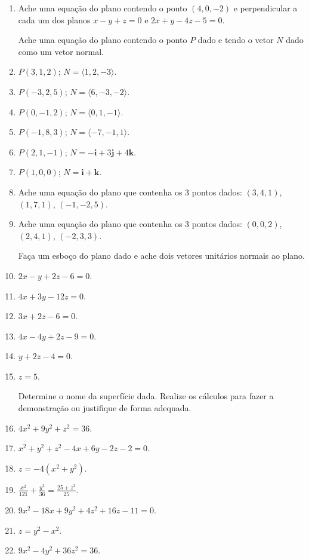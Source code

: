 \documentclass[11pt,a4paper]{article}
\begin{document}
\begin{enumerate}
	\item Ache uma equação do plano contendo o ponto $(4,0,-2)$ e perpendicular a cada um dos planos
	$x - y + z = 0$ e $2x + y - 4z - 5 = 0$.
	
	Ache uma equação do plano contendo o ponto $P$ dado e tendo o vetor $N$ dado como um vetor normal.
	
	\item $P(3,1,2)$; $N = \langle 1, 2, -3 \rangle$.
	 
	\item $P(-3,2,5)$; $N = \langle 6, -3, -2 \rangle$.
	 
	\item $P(0,-1,2)$; $N = \langle 0, 1, -1 \rangle$.
	 
	\item $P(-1,8,3)$; $N = \langle -7, -1, 1 \rangle$.
	 
	\item $P(2,1,-1)$; $N = -\textbf{i} + 3\textbf{j} + 4\textbf{k}$.
	 
	 
	 
	 
	 
	 
	\item $P(1,0,0)$; $N = \textbf{i} + \textbf{k}$.
	
	\item Ache uma equação do plano que contenha os $3$ pontos dados:
	$(3,4,1)$, $(1,7,1)$, $(-1,-2,5)$.
	 
	\item Ache uma equação do plano que contenha os $3$ pontos dados:
	$(0,0,2)$, $(2,4,1)$, $(-2,3,3)$.
	
	Faça um esboço do plano dado e ache dois vetores unitários normais ao plano.
	
	\item $2x - y + 2z - 6 = 0$.
	\item $4x + 3y - 12z = 0$.
	\item $3x + 2z - 6 = 0$.
	\item $4x - 4y + 2z - 9 = 0$.
	\item $y + 2z - 4 = 0$.
	 
	 
	 
	 
	 
	 \item $z = 5$.
	 
	 Determine o nome da superfície dada. Realize os cálculos para fazer a demonstração ou justifique de 			 forma adequada.
	 
	 \item $4x^2 + 9y^2 + z^2 = 36$.
	 \item $x^2 + y^2 + z^2 - 4x + 6y - 2z - 2 = 0$.
	 \item $z = -4(x^2 + y^2)$.
	 \item $\displaystyle\frac{x^2}{121} + \displaystyle\frac{y^2}{36} = \displaystyle\frac{25 + z^2}{25}$.
	 \item $9x^2 - 18x + 9y^2 + 4z^2 + 16z - 11 = 0$.
	 \item $z = y^2 - x^2$.
	 \item $9x^2 - 4y^2 + 36z^2 = 36$.
	 

\end{enumerate}
\end{document}
